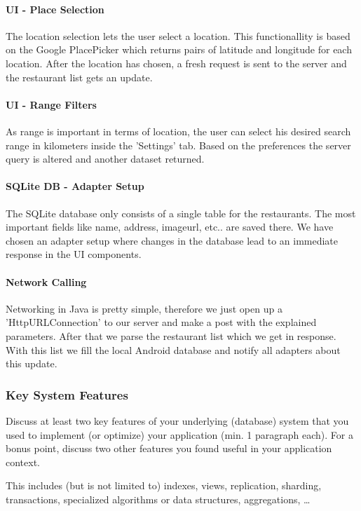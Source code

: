 \paragraph{UI - Place Selection}
The location selection lets the user select a location. This functionallity is based on the Google PlacePicker which returns pairs of latitude and longitude for each location. After the location has chosen, a fresh request is sent to the server and the restaurant list gets an update.
\paragraph{UI - Range Filters}
As range is important in terms of location, the user can select his desired search range in kilometers inside the 'Settings' tab. Based on the preferences the server query is altered and another dataset returned.
\paragraph{SQLite DB - Adapter Setup}
The SQLite database only consists of a single table for the restaurants. The most important fields like name, address, imageurl, etc.. are saved there. We have chosen an adapter setup where changes in the database lead to an immediate response in the UI components.
\paragraph{Network Calling}
Networking in Java is pretty simple, therefore we just open up a 'HttpURLConnection' to our server and make a post with the explained parameters. After that we parse the restaurant list which we get in response. With this list we fill the local Android database and notify all adapters about this update. 

\subsubsection{Key System Features}

Discuss at least two key features of your underlying (database) system that you
used to implement (or optimize) your application (min. 1 paragraph each). For
a bonus point, discuss two other features you found useful in your application
context.

This includes (but is not limited to) indexes, views, replication, sharding,
transactions, specialized algorithms or data structures, aggregations, \ldots

